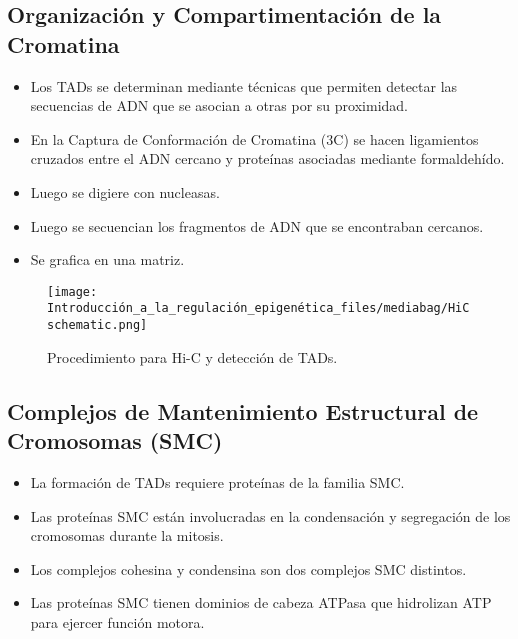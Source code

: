 \documentclass[
  letterpaper,
  DIV=11,
  numbers=noendperiod]{scrartcl}
\providecommand{\tightlist}{%
  \setlength{\itemsep}{0pt}\setlength{\parskip}{0pt}}\usepackage{longtable,booktabs,array}
\begin{document}
\subsection{Organización y Compartimentación de la
Cromatina}\label{organizaciuxf3n-y-compartimentaciuxf3n-de-la-cromatina-3}

\begin{itemize}
\item
  Los TADs se determinan mediante técnicas que permiten detectar las
  secuencias de ADN que se asocian a otras por su proximidad.
\item
  En la Captura de Conformación de Cromatina (3C) se hacen ligamientos
  cruzados entre el ADN cercano y proteínas asociadas mediante
  formaldehído.
\item
  Luego se digiere con nucleasas.
\item
  Luego se secuencian los fragmentos de ADN que se encontraban cercanos.
\item
  Se grafica en una matriz.
\end{itemize}

\begin{figure}[H]

{\centering \texttt{[image: Introducción\_a\_la\_regulación\_epigenética\_files/mediabag/HiCschematic.png]}

}

\caption{Procedimiento para Hi-C y detección de TADs.}

\end{figure}%

\subsection{Complejos de Mantenimiento Estructural de Cromosomas
(SMC)}\label{complejos-de-mantenimiento-estructural-de-cromosomas-smc}

\begin{itemize}
\tightlist
\item
  La formación de TADs requiere proteínas de la familia SMC.
\item
  Las proteínas SMC están involucradas en la condensación y segregación
  de los cromosomas durante la mitosis.
\item
  Los complejos cohesina y condensina son dos complejos SMC distintos.
\item
  Las proteínas SMC tienen dominios de cabeza ATPasa que hidrolizan ATP
  para ejercer función motora.
\end{itemize}
\end{document}

